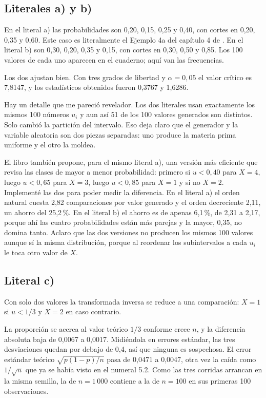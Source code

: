 \documentclass[11pt,letterpaper]{article}
\begin{document}
\subsection{Literales a) y b)}

En el literal a) las probabilidades son 0,20, 0,15, 0,25 y 0,40, con cortes en 0,20, 0,35 y 0,60.
Este caso es literalmente el Ejemplo 4a del capítulo 4 de \cite{ross99}. En el literal b) son 0,30,
0,20, 0,35 y 0,15, con cortes en 0,30, 0,50 y 0,85. Los 100 valores de cada uno aparecen en el
cuaderno; aquí van las frecuencias.



Los dos ajustan bien. Con tres grados de libertad y $\alpha = 0{,}05$ el valor crítico es 7,8147, y
los estadísticos obtenidos fueron 0,3767 y 1,6286.

Hay un detalle que me pareció revelador. Los dos literales usan exactamente los mismos 100 números
$u_i$ y aun así 51 de los 100 valores generados son distintos. Solo cambió la partición del
intervalo. Eso deja claro que el generador y la variable aleatoria son dos piezas separadas: uno
produce la materia prima uniforme y el otro la moldea.

El libro también propone, para el mismo literal a), una versión más eficiente que revisa las clases
de mayor a menor probabilidad: primero si $u < 0{,}40$ para $X = 4$, luego $u < 0{,}65$ para $X = 3$,
luego $u < 0{,}85$ para $X = 1$ y si no $X = 2$. Implementé las dos para poder medir la diferencia. En
el literal a) el orden natural cuesta 2,82 comparaciones por valor generado y el orden decreciente
2,11, un ahorro del 25,2\,\%. En el literal b) el ahorro es de apenas 6,1\,\%, de 2,31 a 2,17, porque
ahí las cuatro probabilidades están más parejas y la mayor, 0,35, no domina tanto. Aclaro
que las dos versiones no producen los mismos 100 valores aunque sí la misma distribución, porque al
reordenar los subintervalos a cada $u_i$ le toca otro valor de $X$.

\subsection{Literal c)}

Con solo dos valores la transformada inversa se reduce a una comparación: $X = 1$ si $u < 1/3$ y
$X = 2$ en caso contrario.



La proporción se acerca al valor teórico $1/3$ conforme crece $n$, y la diferencia absoluta baja de
0,0067 a 0,0017. Midiéndola en errores estándar, las tres desviaciones quedan por debajo de 0,4, así
que ninguna es sospechosa. El error estándar teórico $\sqrt{p(1-p)/n}$ pasa de 0,0471 a 0,0047, otra
vez la caída como $1/\sqrt{n}$ que ya se había visto en el numeral 5.2. Como las tres corridas
arrancan en la misma semilla, la de $n = 1\,000$ contiene a la de $n = 100$ en sus primeras 100
observaciones.
\end{document}
